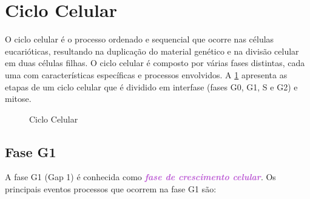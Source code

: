 \documentclass[11pt,a4paper]{article}
\begin{document}
\section{Ciclo Celular}

	O ciclo celular é o processo ordenado e sequencial que ocorre nas células eucarióticas, resultando na duplicação do material genético e na divisão celular em duas células filhas. O ciclo celular é composto por várias fases distintas, cada uma com características específicas e processos envolvidos. A \ref{fig:cicloCelular} apresenta as etapas de um ciclo celular que é dividido em interfase (fases G0, G1, S e G2) e mitose.

	\begin{figure}[h]
		\centering
	\end{figure}
	\begin{figure}[h]
		\centering
		\caption{Ciclo Celular}
		\label{fig:cicloCelular}
	\end{figure}
	
\subsection*{Fase G1}

	A fase G1 (Gap 1) é conhecida como \textcolor{MediumOrchid}{\textbf{\textit{fase de crescimento celular}}}. Os principais eventos processos que ocorrem na fase G1 são:
\end{document}
